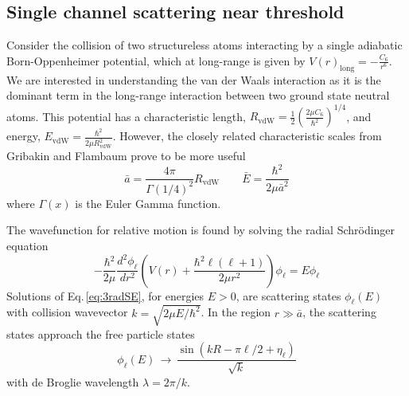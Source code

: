 \subsection{Single channel scattering near threshold} \label{ssec:low_energy}
Consider the collision of two structureless atoms interacting by a single adiabatic Born-Oppenheimer potential, which at long-range is given by $V(r)_{\text{long}} = -\frac{C_6}{r^6}$.
We are interested in understanding the van der Waals interaction as it is the dominant term in the long-range interaction between two ground state neutral atoms.
This potential has a characteristic length, $R_{\mathrm{vdW}} = \frac{1}{2} \left(\frac{2 \mu C_6}{\hbar^2}\right)^{1/4}$, and energy, $E_\mathrm{vdW}=\frac{\hbar^2}{2\mu R_{\mathrm{vdW}}^2}$.
However, the closely related characteristic scales from Gribakin and Flambaum \cite{Boisseau2000a,gfl93} prove to be more useful 
\begin{equation}
	\bar{a} = \frac{4 \pi}{\Gamma(1/4)^2}R_{\mathrm{vdW}} \quad\quad \bar{E}=\frac{\hbar^2}{2\mu\bar{a}^2}
\end{equation}
where $\Gamma(x)$ is the Euler Gamma function.

The wavefunction for relative motion is found by solving the radial Schr\"{o}dinger equation
\begin{equation} \label{eq:3radSE}
	-\frac{\hbar^2}{2 \mu}\frac{d^2 \phi_{\ell}}{dr^2} \left( V(r) + \frac{\hbar^2\ell(\ell+1)}{2\mu r^2} \right) \phi_{\ell}=E\phi_{\ell}
\end{equation}
Solutions of Eq.\,\ref{eq:3radSE}, for energies $E>0$, are scattering states $\phi_{\ell}(E)$ with collision wavevector $k=\sqrt{2\mu E/\hbar^2}$.
In the region $r\gg\bar{a}$, the scattering states approach the free particle states
\begin{equation} \label{eq:3asymwf}
	\phi_{\ell}(E)\,\rightarrow\,\frac{\sin(kR-\pi\ell/2+\eta_{\ell})}{\sqrt{k}}
\end{equation}
with de Broglie wavelength $\lambda = 2\pi/k$.

